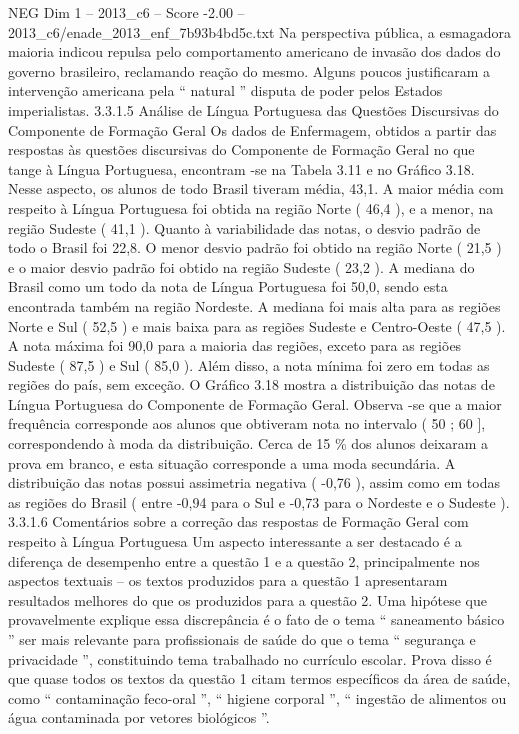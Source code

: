 \begin{textsample}{NEG Dim 1 – 2013\_c6 – Score -2.00 – 2013\_c6/enade\_2013\_enf\_7b93b4bd5c.txt}
Na perspectiva pública, a esmagadora maioria indicou repulsa pelo comportamento americano de invasão dos dados do governo brasileiro, reclamando reação do mesmo.
Alguns poucos justificaram a intervenção americana pela “ natural ” disputa de poder pelos Estados imperialistas. 3.3.1.5 Análise de Língua Portuguesa das Questões Discursivas do Componente de Formação Geral Os dados de Enfermagem, obtidos a partir das respostas às questões discursivas do Componente de Formação Geral no que tange à Língua Portuguesa, encontram -se na Tabela 3.11 e no Gráfico 3.18.
Nesse aspecto, os alunos de todo Brasil tiveram média, 43,1.
A maior média com respeito à Língua Portuguesa foi obtida na região Norte ( 46,4 ), e a menor, na região Sudeste ( 41,1 ).
Quanto à variabilidade das notas, o desvio padrão de todo o Brasil foi 22,8.
O menor desvio padrão foi obtido na região Norte ( 21,5 ) e o maior desvio padrão foi obtido na região Sudeste ( 23,2 ).
A mediana do Brasil como um todo da nota de Língua Portuguesa foi 50,0, sendo esta encontrada também na região Nordeste.
A mediana foi mais alta para as regiões Norte e Sul ( 52,5 ) e mais baixa para as regiões Sudeste e Centro-Oeste ( 47,5 ).
A nota máxima foi 90,0 para a maioria das regiões, exceto para as regiões Sudeste ( 87,5 ) e Sul ( 85,0 ).
Além disso, a nota mínima foi zero em todas as regiões do país, sem exceção.
O Gráfico 3.18 mostra a distribuição das notas de Língua Portuguesa do Componente de Formação Geral.
Observa -se que a maior frequência corresponde aos alunos que obtiveram nota no intervalo ( 50 ; 60 ], correspondendo à moda da distribuição.
Cerca de 15 \% dos alunos deixaram a prova em branco, e esta situação corresponde a uma moda secundária.
A distribuição das notas possui assimetria negativa ( -0,76 ), assim como em todas as regiões do Brasil ( entre -0,94 para o Sul e -0,73 para o Nordeste e o Sudeste ). 3.3.1.6 Comentários sobre a correção das respostas de Formação Geral com respeito à Língua Portuguesa Um aspecto interessante a ser destacado é a diferença de desempenho entre a questão 1 e a questão 2, principalmente nos aspectos textuais – os textos produzidos para a questão 1 apresentaram resultados melhores do que os produzidos para a questão 2.
Uma hipótese que provavelmente explique essa discrepância é o fato de o tema “ saneamento básico ” ser mais relevante para profissionais de saúde do que o tema “ segurança e privacidade ”, constituindo tema trabalhado no currículo escolar.
Prova disso é que quase todos os textos da questão 1 citam termos específicos da área de saúde, como “ contaminação feco-oral ”, “ higiene corporal ”, “ ingestão de alimentos ou água contaminada por vetores biológicos ”.

\end{textsample}

